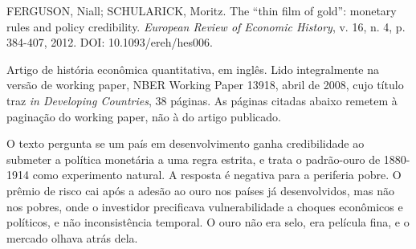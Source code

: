 
\begin{identificacao}
FERGUSON, Niall; SCHULARICK, Moritz. The ``thin film of gold'': monetary rules
and policy credibility. \textit{European Review of Economic History}, v. 16,
n. 4, p. 384-407, 2012. DOI: 10.1093/ereh/hes006.

Artigo de história econômica quantitativa, em inglês. Lido integralmente na
versão de working paper, NBER Working Paper 13918, abril de 2008, cujo título
traz \textit{in Developing Countries}, 38 páginas. As páginas citadas abaixo
remetem à paginação do working paper, não à do artigo publicado.
\end{identificacao}

O texto pergunta se um país em desenvolvimento ganha credibilidade ao submeter a
política monetária a uma regra estrita, e trata o padrão-ouro de 1880-1914 como
experimento natural. A resposta é negativa para a periferia pobre. O prêmio de
risco cai após a adesão ao ouro nos países já desenvolvidos, mas não nos pobres,
onde o investidor precificava vulnerabilidade a choques econômicos e políticos, e
não inconsistência temporal. O ouro não era selo, era película fina, e o mercado
olhava atrás dela.

